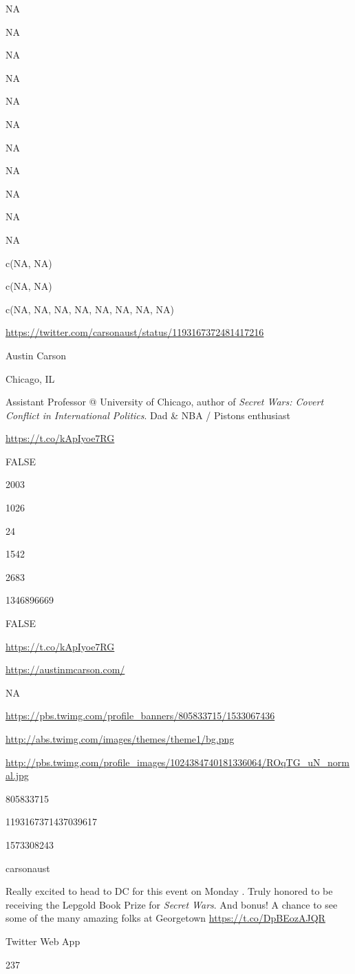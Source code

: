 \documentclass[]{book}
\begin{document}
NA

NA

NA

NA

NA

NA

NA

NA

NA

NA

NA

c(NA, NA)

c(NA, NA)

c(NA, NA, NA, NA, NA, NA, NA, NA)

\url{https://twitter.com/carsonaust/status/1193167372481417216}

Austin Carson

Chicago, IL

Assistant Professor @ University of Chicago, author of \emph{Secret Wars: Covert Conflict in International Politics}. Dad \& NBA / Pistons enthusiast

\url{https://t.co/kApIyoe7RG}

FALSE

2003

1026

24

1542

2683

1346896669

FALSE

\url{https://t.co/kApIyoe7RG}

\url{https://austinmcarson.com/}

NA

\url{https://pbs.twimg.com/profile_banners/805833715/1533067436}

\url{http://abs.twimg.com/images/themes/theme1/bg.png}

\url{http://pbs.twimg.com/profile_images/1024384740181336064/ROqTG_uN_normal.jpg}

805833715

1193167371437039617

1573308243

carsonaust

Really excited to head to DC for this event on Monday \citet{MortaraCenter}. Truly honored to be receiving the Lepgold Book Prize for \emph{Secret Wars}. And bonus! A chance to see some of the many amazing folks at Georgetown
\url{https://t.co/DpBEozAJQR}

Twitter Web App

237
\end{document}
